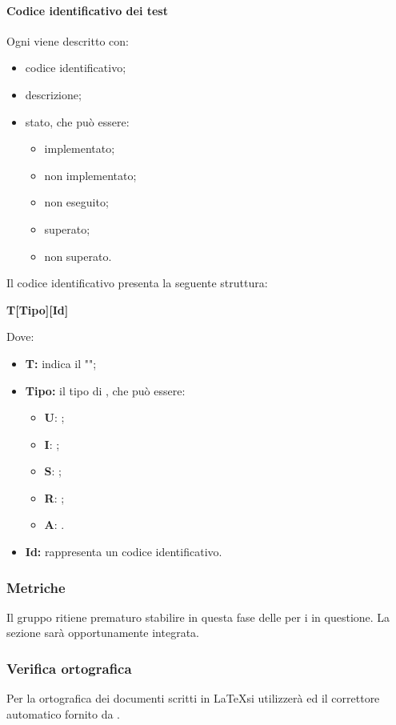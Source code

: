 \paragraph{Codice identificativo dei test}
Ogni  viene descritto con:
\begin{itemize}
	\item codice identificativo;
	\item descrizione;
	\item stato, che può essere:
	\begin{itemize}
		\item implementato;
		\item non implementato;
		\item non eseguito;
		\item superato;
		\item non superato.
	\end{itemize}
\end{itemize}
Il codice identificativo presenta la seguente struttura:\newline
\centerline{\textbf{T[Tipo][Id]}}
\newline
Dove:
\begin{itemize}
	\item \textbf{T:} indica il "";
	\item \textbf{Tipo:} il tipo di , che può essere:
	\begin{itemize}
		\item \textbf{U}: ;
		\item \textbf{I}: ;
		\item \textbf{S}: ;
		\item \textbf{R}: ;
		\item \textbf{A}: .
	\end{itemize}
	\item \textbf{Id:} rappresenta un codice identificativo.
\end{itemize}

\subsubsection{Metriche}
Il gruppo ritiene prematuro stabilire in questa fase delle  per i  in questione. La sezione sarà opportunamente integrata.
\subsubsection{Verifica ortografica}
Per la  ortografica dei documenti scritti in \LaTeX si utilizzerà  ed il correttore automatico fornito da .
